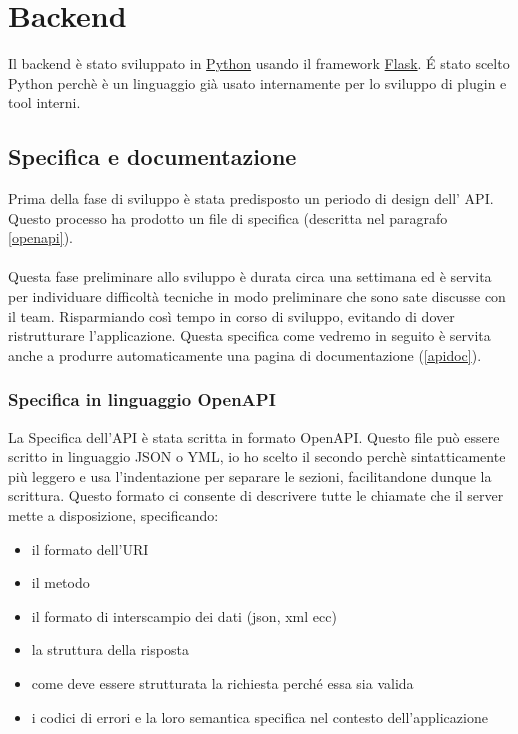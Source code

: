 \chapter{Backend}
        Il backend è stato sviluppato in \href{https://www.python.org}{Python} usando il framework \href{https://flask.palletsprojects.com/en/1.1.x/}{Flask}.
        \'E stato scelto Python perchè è un linguaggio già usato internamente per lo sviluppo di plugin e tool interni.

        \section{Specifica e documentazione}
            Prima della fase di sviluppo è stata predisposto un periodo di design dell' API.
            Questo processo ha prodotto un file di specifica (descritta nel paragrafo 
            \ref{openapi}).\\\\
            Questa fase preliminare allo sviluppo è durata circa una settimana ed è servita per 
            individuare difficoltà tecniche in modo preliminare che sono sate discusse con il team.
            Risparmiando così tempo in corso di sviluppo, evitando di dover ristrutturare l'applicazione.
            Questa specifica come vedremo in seguito è servita anche a produrre automaticamente una pagina di documentazione (\ref{apidoc}).
                
            \subsection{Specifica in linguaggio OpenAPI\label{openapi}}
                La Specifica dell'API è stata scritta in formato OpenAPI.
                Questo file può essere scritto in linguaggio JSON o YML, io ho scelto il secondo perchè
                sintatticamente più leggero e usa l'indentazione per separare le sezioni, facilitandone dunque la scrittura. 
                Questo formato ci consente di descrivere tutte le chiamate che il server 
                mette a disposizione, specificando:
                \begin{itemize}
                    \item il formato dell'URI 
                    \item il metodo
                    \item il formato di interscampio dei dati (json, xml ecc) 
                    \item la struttura della risposta
                    \item come deve essere strutturata la richiesta perch\'e essa sia valida
                        \item i codici di errori e la loro semantica specifica nel contesto dell'applicazione
                \end{itemize}
                
